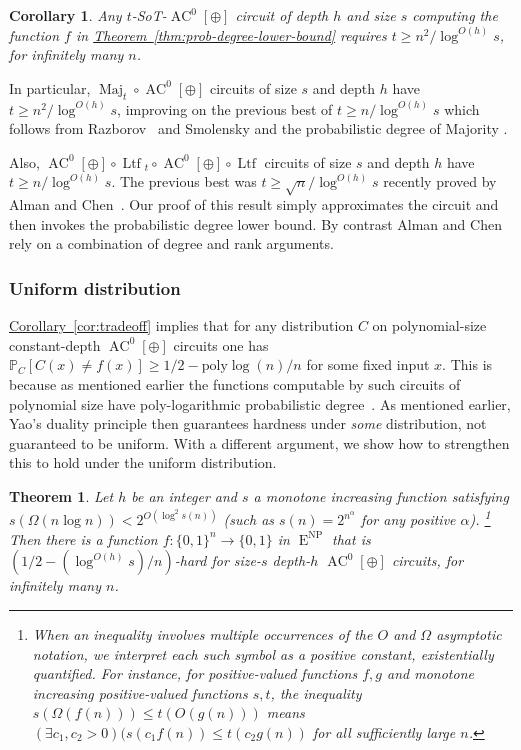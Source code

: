 \documentclass[11pt]{article}
\newcommand{\expref}[2]{\texorpdfstring{\hyperref[#2]{#1~\ref{#2}}}{#1~\ref{#2}}}
\newtheorem{thm}[theorem]{Theorem}
\newtheorem{cor}[theorem]{Corollary}
\DeclareMathOperator{\Maj}{\mathrm{Maj}}  %
\DeclareMathOperator{\Ltf}{\mathrm{Ltf}}  %
\DeclareMathOperator{\AC}{\mathrm{AC}}  %
\DeclareMathOperator{\NP}{\mathrm{NP}}  %
\DeclareMathOperator{\EEE}{\mathrm{E}}  %
\newcommand{\zo}{\{0, 1\}}
\renewcommand{\P}{\mathbb{P}}
\newcommand{\poly}{\mathrm{poly}}
\begin{document}
\begin{cor}
\label{cor:SOT-lower-bounds} Any $t$-SoT-$\AC^{0}[\oplus]$ circuit
of depth $h$ and size $s$ computing the function $f$ in \expref{Theorem}{thm:prob-degree-lower-bound} requires $t\ge n^{2}/\log^{O(h)}s$,
for infinitely many $n$.
\end{cor}

In particular, $\Maj_{t}\circ \AC^{0}[\oplus]$ circuits of size $s$
and depth $h$ have $t\ge n^{2}/\log^{O(h)}s$, improving on the previous
best of $t\ge n/\log^{O(h)}s$ which follows from Razborov~\cite{Raz87}
and Smolensky \cite{Smo87,Smolensky93} and the probabilistic degree
of Majority \cite{DBLP:conf/fsttcs/Srinivasan13,DBLP:conf/focs/AlmanW15}.

Also, $\AC^{0}[\oplus]\circ \Ltf{}_{t}\circ \AC^{0}[\oplus]\circ \Ltf$
circuits of size $s$ and depth $h$ have $t\ge n/\log^{O(h)}s$.
The previous best was $t\ge\sqrt{n}/\log^{O(h)}s$ recently proved
by Alman and Chen~\cite{AlmanC19}. Our proof of this result simply
approximates the circuit and then invokes the probabilistic degree
lower bound. By contrast Alman and Chen rely on a combination of degree
and rank arguments.

\subsubsection{Uniform distribution}

\expref{Corollary}{cor:tradeoff} implies that for any distribution $C$
on polynomial-size constant-depth $\AC^{0}[\oplus]$ circuits one has
$\P_{C}[C(x)\ne f(x)]\ge1/2-\poly\log(n)/n$ for some fixed input
$x$. This is because as mentioned earlier the functions computable
by such circuits of %
polynomial size  %
have poly-logarithmic probabilistic
degree~\cite{Raz87}. As mentioned earlier, Yao's duality principle
\cite{DBLP:conf/focs/Yao77} then guarantees hardness under \emph{some
}distribution, not guaranteed to be uniform. With a different argument,
we show how to strengthen this to hold under the uniform distribution.

\begin{thm}
  \label{thm:uniform} Let $h$ be an integer and $s$ a
monotone increasing  %
function satisfying
%
%
$s(\Omega(n\log n)) < 2^{O(\log^{2}s(n))}$  %
%
%
%
%
(such as $s(n)=2^{n^{\alpha}}$
for any
positive  %
$\alpha$).%
\footnote{When an inequality involves multiple occurrences of the $O$ and $\Omega$
  asymptotic notation, we interpret each such symbol as a positive constant,
  existentially quantified.  For instance, for positive-valued functions $f,g$ and
  monotone increasing positive-valued functions $s,t$, the inequality
  $s(\Omega(f(n)))\le t(O(g(n)))$ means $(\exists c_1, c_2 > 0)
  (s(c_1 f(n)) \le t(c_2 g(n))$ for all sufficiently large $n$.}
%
%
%
%
Then there %
is a function $f:\zo^{n}\to\zo$ in $\EEE^{\NP}$ that is $(1/2-(\log^{O(h)}s)/n)$-hard
for size-$s$ depth-$h$ $\AC^{0}[\oplus]$ circuits, for infinitely
many $n$.
\end{thm}
\end{document}

